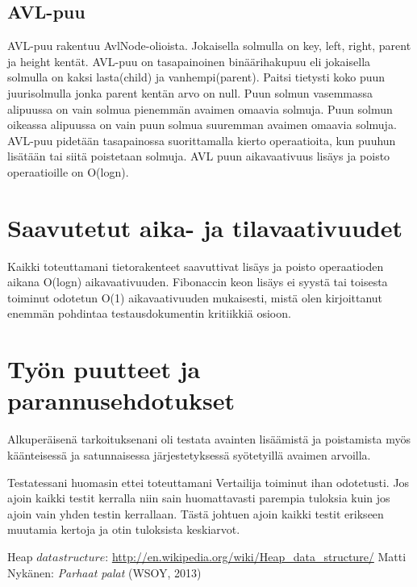 \documentclass[11pt,a4paper]{article}
\begin{document}
\subsection{AVL-puu}
AVL-puu rakentuu AvlNode-olioista. Jokaisella solmulla on key, left, right, parent ja height kentät.
AVL-puu on tasapainoinen binäärihakupuu eli jokaisella solmulla on kaksi lasta(child) ja vanhempi(parent). Paitsi tietysti koko puun juurisolmulla jonka parent kentän arvo on null. Puun solmun vasemmassa alipuussa on vain solmua pienemmän avaimen omaavia solmuja. Puun solmun oikeassa alipuussa on vain puun solmua suuremman avaimen omaavia solmuja. AVL-puu pidetään tasapainossa suorittamalla kierto operaatioita, kun puuhun lisätään tai siitä poistetaan solmuja. AVL puun aikavaativuus lisäys ja poisto operaatioille on O(logn). 
\section{Saavutetut aika- ja tilavaativuudet}
Kaikki toteuttamani tietorakenteet saavuttivat lisäys ja poisto operaatioden aikana O(logn) aikavaativuuden. Fibonaccin keon lisäys ei syystä tai toisesta toiminut odotetun O(1) aikavaativuuden mukaisesti, mistä olen kirjoittanut enemmän pohdintaa testausdokumentin kritiikkiä osioon.
\section{Työn puutteet ja parannusehdotukset}
Alkuperäisenä tarkoituksenani oli testata avainten lisäämistä ja poistamista myös käänteisessä ja satunnaisessa järjestetyksessä syötetyillä avaimen arvoilla. 

Testatessani huomasin ettei toteuttamani Vertailija toiminut ihan odotetusti. Jos ajoin kaikki testit kerralla niin sain huomattavasti parempia tuloksia kuin jos ajoin vain yhden testin kerrallaan. Tästä johtuen ajoin kaikki testit erikseen muutamia kertoja ja otin tuloksista keskiarvot. 

\begin{thebibliography}{9}
 Heap \(data structure\): \newline
\url{http://en.wikipedia.org/wiki/Heap_data_structure/} 
 Matti Nykänen: 
\textit{Parhaat palat} (WSOY, 2013)
\end{thebibliography}
\end{document}
